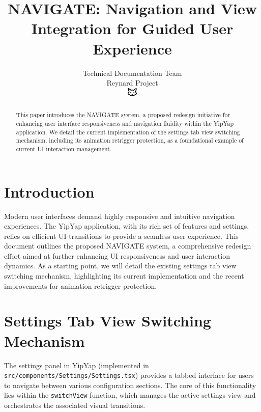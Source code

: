 \documentclass[10pt]{article}
\begin{document}
\title{NAVIGATE: Navigation and View Integration for Guided User Experience}

\author{Technical Documentation Team\\
Reynard Project\\
\includegraphics[width=0.5cm]{favicon.pdf}}

\maketitle

\begin{abstract}
This paper introduces the NAVIGATE system, a proposed redesign initiative for enhancing user interface responsiveness and navigation fluidity within the YipYap application. We detail the current implementation of the settings tab view switching mechanism, including its animation retrigger protection, as a foundational example of current UI interaction management.
\end{abstract}

\section{Introduction}

Modern user interfaces demand highly responsive and intuitive navigation experiences. The YipYap application, with its rich set of features and settings, relies on efficient UI transitions to provide a seamless user experience. This document outlines the proposed NAVIGATE system, a comprehensive redesign effort aimed at further enhancing UI responsiveness and user interaction dynamics. As a starting point, we will detail the existing settings tab view switching mechanism, highlighting its current implementation and the recent improvements for animation retrigger protection.

\section{Settings Tab View Switching Mechanism}

The settings panel in YipYap (implemented in \texttt{src/components/Settings/Settings.tsx}) provides a tabbed interface for users to navigate between various configuration sections. The core of this functionality lies within the \texttt{switchView} function, which manages the active settings view and orchestrates the associated visual transitions.
\end{document}
